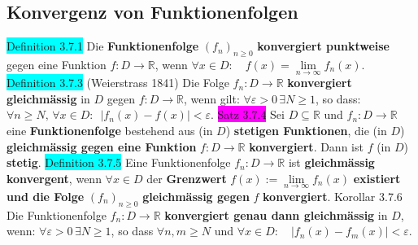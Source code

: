 \documentclass[landscape, 10pt]{article}
\newcommand{\R}{\mathbb{R}}
\begin{document}
\begin{multicols}{3}
\subsection{Konvergenz von Funktionenfolgen}
\colorbox{cyan}{Definition 3.7.1} Die \textbf{Funktionenfolge} 
                \textcolor{NavyBlue}{$(f_n)_{n\geqslant0}$}
                \textbf{konvergiert punktweise} gegen eine Funktion
                \textcolor{NavyBlue}{$f:D\longrightarrow\R$}, wenn 
                \textcolor{NavyBlue}{
                $\forall x\in D:\quad f(x)=\lim\limits_{n\to\infty}f_n(x)$}.
\colorbox{cyan}{Definition 3.7.3} (Weierstrass 1841) Die Folge 
                \textcolor{NavyBlue}{$f_n:D\longrightarrow\R$} 
                \textbf{konvergiert gleichmässig} in 
                \textcolor{NavyBlue}{$D$} gegen 
                \textcolor{NavyBlue}{$f:D\longrightarrow\R$}, 
                wenn gilt: 
                \textcolor{NavyBlue}{$\forall\varepsilon>0\,\exists N\geqslant1$}, 
                so dass: \textcolor{NavyBlue}{
                $\forall n\geqslant N,\,\forall x\in D:\enspace |f_n(x)-f(x)|<\varepsilon$}.
\colorbox{magenta}{Satz 3.7.4} Sei \textcolor{NavyBlue}{$D\subseteq\R$} und 
                \textcolor{NavyBlue}{$f_n:D\longrightarrow\R$} 
                eine \textbf{Funktionenfolge} bestehend aus 
                (in $D$) \textbf{stetigen Funktionen}, die 
                (in $D$) \textbf{gleichmässig gegen eine 
                Funktion} \textcolor{NavyBlue}{$f:D\longrightarrow\R$} 
                \textbf{konvergiert}. 
                Dann ist \textcolor{NavyBlue}{$f$} (in $D$) \textbf{stetig}.
\colorbox{cyan}{Definition 3.7.5} Eine Funktionenfolge 
                \textcolor{NavyBlue}{$f_n:D\longrightarrow\R$}
                ist \textbf{gleichmässig konvergent}, wenn 
                \textcolor{NavyBlue}{$\forall x\in D$} der 
                \textbf{Grenzwert} 
                \textcolor{NavyBlue}{$f(x):=\lim\limits_{n\to\infty}f_n(x)$}
                \textbf{existiert und die Folge}
                \textcolor{NavyBlue}{$(f_n)_{n\geqslant0}$} 
                \textbf{gleichmässig gegen} \textcolor{NavyBlue}{$f$} 
                \textbf{konvergiert}.
\colorbox{BurntOrange}{Korollar 3.7.6} Die Funktionenfolge 
                \textcolor{NavyBlue}{$f_n:D\longrightarrow\R$}
                \textbf{konvergiert genau dann gleichmässig} in $D$, wenn: 
                \textcolor{NavyBlue}{$\forall\varepsilon>0\,\exists N\geqslant1$}, 
                so dass 
                \textcolor{NavyBlue}{$\forall n,m\geqslant N$} und 
                \textcolor{NavyBlue}{$\forall x\in D:\quad |f_n(x)-f_m(x)|<\varepsilon$}.

\end{multicols}
\end{document}
